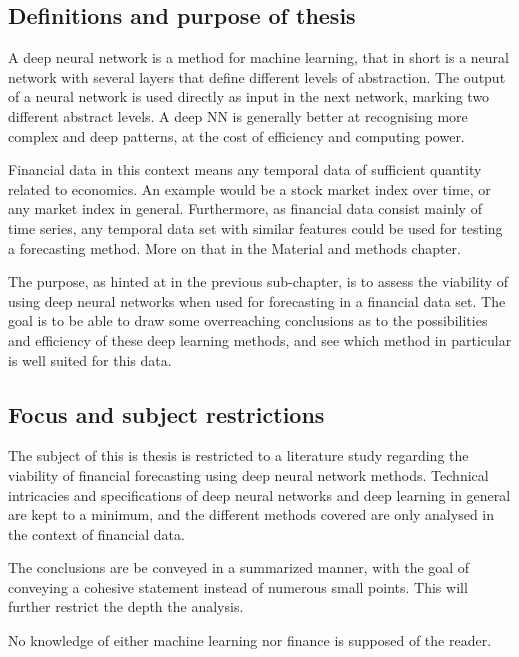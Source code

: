 \subsection{Definitions and purpose of thesis}


A deep neural network is a method for machine learning, that in short is a neural network with several layers that define different levels of abstraction. The output of a neural network is used directly as input in the next network, marking two different abstract levels. A deep NN is generally better at recognising more complex and deep patterns, at the cost of efficiency and computing power.

Financial data in this context means any temporal data of sufficient quantity related to economics. An example would be a stock market index over time, or any market index in general. Furthermore, as financial data consist mainly of time series, any temporal data set with similar features could be used for testing a forecasting method. More on that in the Material and methods chapter.

The purpose, as hinted at in the previous sub-chapter, is to assess the viability of using deep neural networks when used for forecasting in a financial data set. The goal is to be able to draw some overreaching conclusions as to the possibilities and efficiency of these deep learning methods, and see which method in particular is well suited for this data.

\subsection{Focus and subject restrictions}

The subject of this is thesis is restricted to a literature study regarding the viability of financial forecasting using deep neural network methods. Technical intricacies and specifications of deep neural networks and deep learning in general are kept to a minimum, and the different methods covered are only analysed in the context of financial data.

The conclusions are be conveyed in a summarized manner, with the goal of conveying a cohesive statement instead of numerous small points. This will further restrict the depth the analysis.


No knowledge of either machine learning nor finance is supposed of the reader.






